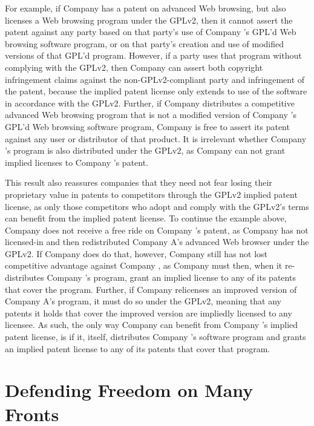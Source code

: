 For example, if Company \compA{} has a patent on advanced Web browsing, but
also licenses a Web browsing program under the GPLv2, then it
cannot assert the patent against any party based on that party's use of 
Company \compA{}'s GPL'd Web browsing software program, or on that party's
creation and use of modified versions of that GPL'd program.  However, if a
party uses that program without
complying with the GPLv2, then Company \compA{} can assert both copyright
infringement claims against the non-GPLv2-compliant party and
infringement of the patent, because the implied patent license only
extends to use of the software in accordance with the GPLv2. Further, if
Company \compB{} distributes a competitive advanced Web browsing program 
that is not a modified version of Company \compA{}'s GPL'd Web browsing software
program, Company \compA{} is free to assert its patent against any user or
distributor of that product. It is irrelevant whether Company \compB's
program is also distributed under the GPLv2, as Company \compB{} can not grant
implied licenses to Company \compA's patent.

This result also reassures companies that they need not fear losing their
proprietary value in patents to competitors through the GPLv2 implied patent
license, as only those competitors who adopt and comply with the GPLv2's
terms can benefit from the implied patent license. To continue the
example above, Company \compB{} does not receive a free ride on Company
\compA's patent, as Company \compB{} has not licensed-in and then
redistributed Company A's advanced Web browser under the GPLv2. If Company
\compB{} does do that, however, Company \compA{} still has not lost
competitive advantage against Company \compB{}, as Company \compB{} must then,
when it re-distributes Company \compA's program, grant an implied license
to any of its patents that cover the program. Further, if Company \compB{}
relicenses an improved version of Company A's program, it must do so under
the GPLv2, meaning that any patents it holds that cover the improved version
are impliedly licensed to any licensee. As such, the only way Company
\compB{} can benefit from Company \compA's implied patent license, is if it,
itself, distributes Company \compA's software program and grants an
implied patent license to any of its patents that cover that program.

\chapter{Defending Freedom on Many Fronts}

